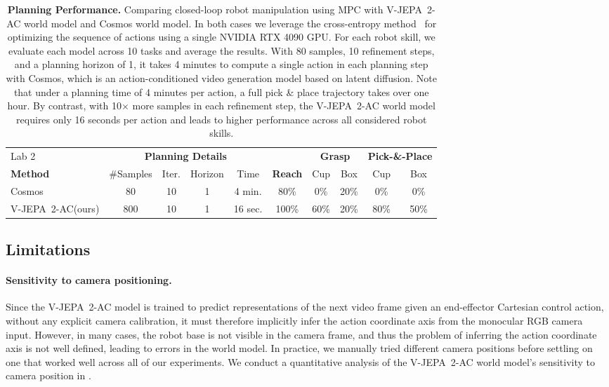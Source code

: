 \documentclass[]{fairmeta}
\newcommand{\acModel}{V-JEPA~2-AC\xspace}
\begin{document}
\begin{table}[t]
    \small
    \caption{
    \small{\bf Planning Performance.} 
    Comparing closed-loop robot manipulation using MPC with \acModel world model and Cosmos world model.
    In both cases we leverage the cross-entropy method~\citep{rubinstein1997optimization} for optimizing the sequence of actions using a single NVIDIA RTX 4090 GPU.
    For each robot skill, we evaluate each model across 10 tasks and average the results.
    With 80 samples, 10 refinement steps, and a planning horizon of 1, it takes 4 minutes to compute a single action in each planning step with Cosmos, which is an action-conditioned video generation model based on latent diffusion.
    Note that under a planning time of 4 minutes per action, a full pick \& place trajectory takes over one hour.
    By contrast, with 10$\times$ more samples in each refinement step, the \acModel world model requires only 16 seconds per action and leads to higher performance across all considered robot skills.  
    }
    \label{tb:cosmos}
    \centering
    \begin{tabular}{lcccc|ccccc}
        Lab 2 & \multicolumn{4}{c}{\bf Planning Details} & & \multicolumn{2}{c}{\bf Grasp} & \multicolumn{2}{c}{\bf Pick-\&-Place} \\
        \cmidrule(lr{.75em}){7-8} \cmidrule(lr{.75em}){9-10}
        \bf Method & \#Samples & Iter. & Horizon & Time & \bf Reach & Cup & Box & Cup & Box \\\midrule
        {Cosmos}~{\small\citep{agarwal2025cosmos}} & 80 & 10 & 1 & 4 min. & 80\% & 0\% & 20\% & 0\% & 0\% \\
        \acModel (ours) & 800 & 10 & 1 & 16 sec. & 100\% & 60\% & 20\% & 80\% & 50\% \\  \bottomrule
    \end{tabular}
\end{table} 
\subsection{Limitations}

\paragraph{\bf Sensitivity to camera positioning.}
Since the \acModel model is trained to predict representations of the next video frame given an end-effector Cartesian control action, without any explicit camera calibration, it must therefore implicitly infer the action coordinate axis from the monocular RGB camera input.
However, in many cases, the robot base is not visible in the camera frame, and thus the problem of inferring the action coordinate axis is not well defined, leading to errors in the world model.
In practice, we manually tried different camera positions before settling on one that worked well across all of our experiments.
We conduct a quantitative analysis of the \acModel world model's sensitivity to camera position in .
\end{document}
